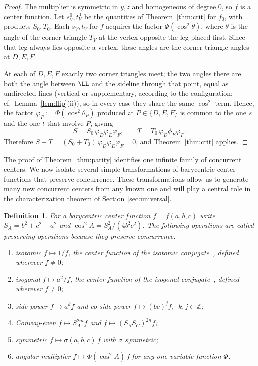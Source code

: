 \documentclass[12pt,a4paper]{amsart}
\newtheorem{definition}[theorem]{Definition}
\theoremstyle{remark}
\begin{document}
\begin{proof}
The multiplier is symmetric in $y,z$ and homogeneous of degree $0$, so $f$ is a
center function. Let $s_V^{0},t_V^{0}$ be the quantities of Theorem~\ref{thm:crit}
for $f_0$, with products $S_0,T_0$. Each $s_V,t_V$ for $f$ acquires the factor
$\Phi(\cos^{2}\theta)$, where $\theta$ is the angle of the corner triangle
$T_V$ at the vertex opposite the leg placed first. Since that leg
always lies opposite a vertex, these angles are the corner-triangle angles
at $D,E,F$.

At each of $D,E,F$ exactly two corner triangles meet; the two
angles there are both the angle between $\LL$ and the sideline through that
point, equal as undirected lines (vertical or supplementary, according to the
configuration; cf.\ Lemma~\ref{lem:flip}(ii)), so in every case they share the
same $\cos^{2}$ term. Hence, the factor
$\varphi_P:=\Phi(\cos^{2}\theta_P)$ produced at $P\in\{D,E,F\}$ is common to the one
$s$ and the one $t$ that involve $P$, giving
\[
  S=S_0\,\varphi_D\varphi_E\varphi_F,\qquad T=T_0\,\varphi_D\phi_E\varphi_F .
\]
Therefore $S+T=(S_0+T_0)\,\varphi_D\varphi_E\varphi_F=0$, and Theorem~\ref{thm:crit} applies.
\end{proof}

The proof of Theorem~\ref{thm:parity} identifies one infinite family of concurrent centers. We now isolate several simple transformations of barycentric center functions that preserve concurrence. These transformations allow us to generate many new concurrent centers from any known one and will play a central role in the characterization theorem of Section~\ref{sec:universal}.

\begin{definition}\label{def:ops}
For a barycentric center function $f=f(a,b,c)$ write $S_A=b^2+c^2-a^2$ and
$\cos^2\!A=S_A^2/(4b^2c^2)$. The following operations are called \emph{preserving operations}
because they preserve concurrence.
\begin{enumerate}
\item[(O1)] \emph{isotomic} $f\mapsto 1/f$, the center function of the isotomic conjugate~\cite{Yiu},
  defined wherever $f\neq0$;
\item[(O2)] \emph{isogonal} $f\mapsto a^2/f$, the center function of the isogonal conjugate~\cite{Yiu},
  defined wherever $f\neq0$;
\item[(O3)] \emph{side-power} $f\mapsto a^{k}f$ and \emph{co-side-power}
  $f\mapsto (bc)^{j}f$, $\;k,j\in\mathbb Z$;
\item[(O4)] \emph{Conway-even} $f\mapsto S_A^{2m}f$ and $f\mapsto (S_BS_C)^{2n}f$;
\item[(O5)] \emph{symmetric} $f\mapsto \sigma(a,b,c)\,f$ with $\sigma$ symmetric;
\item[(O6)] \emph{angular multiplier} $f\mapsto \Phi(\cos^2\!A)\,f$ for any one-variable function $\Phi$.
\end{enumerate}
\end{definition}
\end{document}

